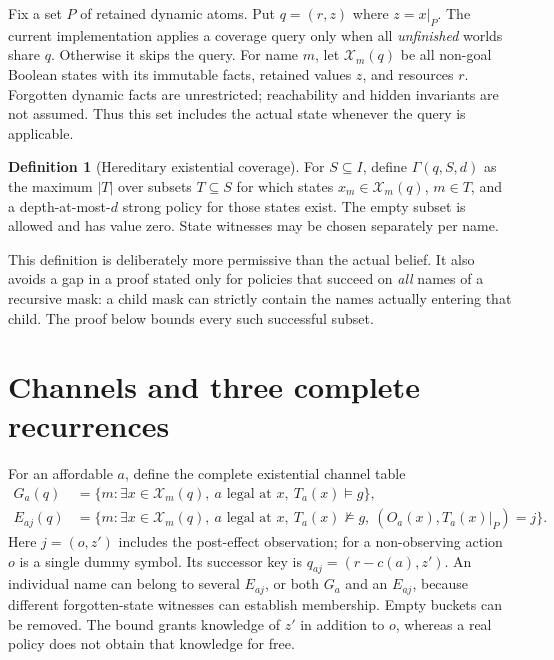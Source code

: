 \documentclass[11pt]{article}
\theoremstyle{definition}
\newtheorem{definition}[theorem]{Definition}
\newcommand{\card}[1]{\lvert #1\rvert}
\begin{document}
Fix a set $P$ of retained dynamic atoms. Put $q=(r,z)$ where $z=x|_P$.
The current implementation applies a coverage query only when all
\emph{unfinished} worlds share $q$. Otherwise it skips the query. For name $m$,
let $\mathcal X_m(q)$ be all non-goal Boolean states with its immutable facts,
retained values $z$, and resources $r$. Forgotten dynamic facts are unrestricted;
reachability and hidden invariants are not assumed. Thus this set includes the
actual state whenever the query is applicable.

\begin{definition}[Hereditary existential coverage]
For $S\subseteq I$, define $\Gamma(q,S,d)$ as the maximum $\card T$ over subsets
$T\subseteq S$ for which states $x_m\in\mathcal X_m(q)$, $m\in T$, and a
depth-at-most-$d$ strong policy for those states exist. The empty subset is
allowed and has value zero. State witnesses may be chosen separately per name.
\end{definition}
This definition is deliberately more permissive than the actual belief. It
also avoids a gap in a proof stated only for policies that succeed on \emph{all}
names of a recursive mask: a child mask can strictly contain the names actually
entering that child. The proof below bounds every such successful subset.

\section{Channels and three complete recurrences}
For an affordable $a$, define the complete existential channel table
\begin{align*}
G_a(q)&=\{m:\exists x\in\mathcal X_m(q),\ a\text{ legal at }x,
                                      \ T_a(x)\models g\},\\
E_{aj}(q)&=\{m:\exists x\in\mathcal X_m(q),\ a\text{ legal at }x,
               \ T_a(x)\not\models g,\ (O_a(x),T_a(x)|_P)=j\}.
\end{align*}
Here $j=(o,z')$ includes the post-effect observation; for a non-observing action
$o$ is a single dummy symbol. Its successor key is $q_{aj}=(r-c(a),z')$.
An individual name can belong to several $E_{aj}$, or both $G_a$ and an $E_{aj}$,
because different forgotten-state witnesses can establish membership.
Empty buckets can be removed. The bound grants knowledge of $z'$ in addition
to $o$, whereas a real policy does not obtain that knowledge for free.
\end{document}
